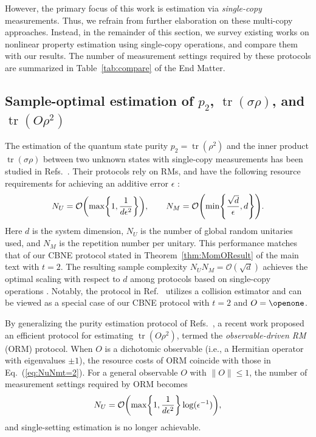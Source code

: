 \documentclass[aps,prl,twocolumn,nofootinbib,superscriptaddress,10pt]{revtex4-2}
\let\originalleft\left
\let\originalright\right
\renewcommand{\left}{\mathopen{}\mathclose\bgroup\originalleft}
\renewcommand{\right}{\aftergroup\egroup\originalright}
\DeclareMathOperator{\Tr}{tr}
\newcommand{\bigo}[1]{\mathcal{O}\left(#1\right)}
\theoremstyle{plain}
\theoremstyle{definition}
\newcommand{\eref}[1]{Eq.~\textup{(\ref{#1})}}
\newcommand{\tref}[1]{Theorem~\ref{#1}}
\begin{document}
However, the primary focus of this work is estimation via \emph{single-copy} measurements. Thus, we refrain from further elaboration on these multi-copy approaches. Instead, in the remainder of this section, we survey existing works on nonlinear property estimation using single-copy operations, and compare them with our results.
The number of measurement settings required by these protocols are summarized in Table~\ref{tab:compare} of the End Matter. 


\subsection{Sample-optimal estimation of \texorpdfstring{$p_2$}{}, \texorpdfstring{$\Tr(\sigma\rho)$}{}, and \texorpdfstring{$\Tr(O\rho^2)$}{}}

The estimation of the quantum state purity $p_2=\Tr(\rho^2)$ and the inner product $\Tr(\sigma\rho)$ between two unknown states with single-copy measurements has been studied in Refs.~\cite{PhysRevA.99.052323,brydges2019probing,PhysRevLett.124.010504,anshu2022distributed}. 
Their protocols rely on RMs, and have the following resource requirements for achieving an additive error $\epsilon$ \cite{anshu2022distributed}: 
\begin{align} \label{eq:NuNmt=2}
N_U = \bigo{\max\left\lbrace 1, \dfrac{1 }{d\epsilon^2} \right\rbrace}, 
\qquad 
N_M=  \bigo{\min\left\lbrace \frac{\sqrt{d}}{\epsilon}, d \right\rbrace}.
\end{align}
Here $d$ is the system dimension, $N_U$ is the number of global random unitaries used, and $N_M$ is the repetition number per unitary. %
This performance matches that of our CBNE protocol stated in \tref{thm:MomOResult} of the main text with $t=2$. 
The resulting sample complexity $N_U N_M=\mathcal O(\sqrt{d})$ achieves the optimal scaling with respect to $d$ among protocols based on single-copy operations \cite{anshu2022distributed,chen2022exponential,gong2024sample}.
Notably, the protocol in Ref.~\cite{anshu2022distributed} utilizes a collision estimator and can be viewed as a special case of our CBNE protocol with $t=2$ and $O=\openone$. 



By generalizing the purity estimation protocol of Refs.~\cite{PhysRevA.99.052323,brydges2019probing}, a recent work \cite{du2025optimal} proposed an efficient protocol for estimating 
$\Tr(O\rho^2)$, termed the \emph{observable-driven RM} (ORM) protocol. 
When $O$ is a dichotomic observable (i.e., a Hermitian operator with eigenvalues $\pm1$), the resource costs of ORM coincide with those in \eref{eq:NuNmt=2}. %
For a general observable $O$ with $\|O\|\leq 1$, the number of measurement settings required by ORM becomes
\begin{align} \label{eq:NuNmt=2Liu}
N_U = \bigo{\max\left\lbrace 1, \dfrac{1 }{d\epsilon^2} \right\rbrace \log(\epsilon^{-1})}, 
\end{align}
and single-setting estimation is no longer achievable. 
\end{document}
